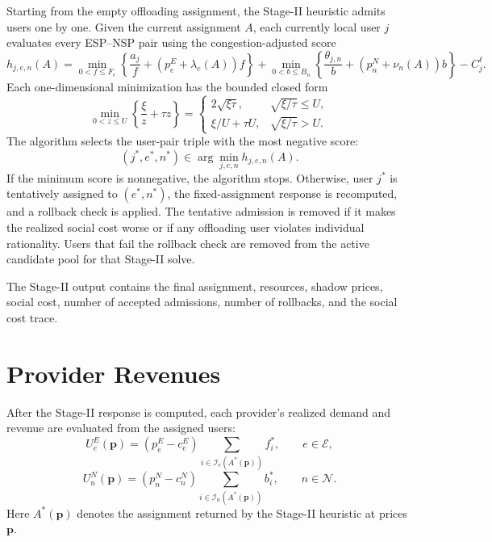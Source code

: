 \documentclass[11pt]{article}
\begin{document}
Starting from the empty offloading assignment, the Stage-II heuristic admits
users one by one.  Given the current assignment \(A\), each currently local
user \(j\) evaluates every ESP--NSP pair using the congestion-adjusted score
\begin{equation}
    h_{j,e,n}(A)
    =
    \min_{0<f\le F_e}
    \left\{
        \frac{a_j}{f}
        +(p^E_e+\lambda_e(A))f
    \right\}
    +
    \min_{0<b\le B_n}
    \left\{
        \frac{\theta_{j,n}}{b}
        +(p^N_n+\nu_n(A))b
    \right\}
    -
    C_j^\ell .
    \label{eq:multi-provider-score}
\end{equation}
Each one-dimensional minimization has the bounded closed form
\begin{equation}
    \min_{0<z\le U}\left\{\frac{\xi}{z}+\tau z\right\}
    =
    \begin{cases}
    2\sqrt{\xi\tau}, & \sqrt{\xi/\tau}\le U,\\[2mm]
    \xi/U+\tau U, & \sqrt{\xi/\tau}>U.
    \end{cases}
    \label{eq:bounded-1d-min}
\end{equation}
The algorithm selects the user-pair triple with the most negative score:
\[
    (j^*,e^*,n^*)
    \in
    \arg\min_{j,e,n} h_{j,e,n}(A).
\]
If the minimum score is nonnegative, the algorithm stops.  Otherwise, user
\(j^*\) is tentatively assigned to \((e^*,n^*)\), the fixed-assignment response
is recomputed, and a rollback check is applied.  The tentative admission is
removed if it makes the realized social cost worse or if any offloading user
violates individual rationality.  Users that fail the rollback check are
removed from the active candidate pool for that Stage-II solve.

The Stage-II output contains the final assignment, resources, shadow prices,
social cost, number of accepted admissions, number of rollbacks, and the social
cost trace.

\section{Provider Revenues}

After the Stage-II response is computed, each provider's realized demand and
revenue are evaluated from the assigned users:
\begin{equation}
    U^E_e(\boldsymbol p)
    =
    (p^E_e-c^E_e)
    \sum_{i\in\mathcal I_e(A^*(\boldsymbol p))} f_i^*,
    \qquad e\in\mathcal E,
    \label{eq:esp-revenue}
\end{equation}
\begin{equation}
    U^N_n(\boldsymbol p)
    =
    (p^N_n-c^N_n)
    \sum_{i\in\mathcal I_n(A^*(\boldsymbol p))} b_i^*,
    \qquad n\in\mathcal N.
    \label{eq:nsp-revenue}
\end{equation}
Here \(A^*(\boldsymbol p)\) denotes the assignment returned by the Stage-II
heuristic at prices \(\boldsymbol p\).
\end{document}
